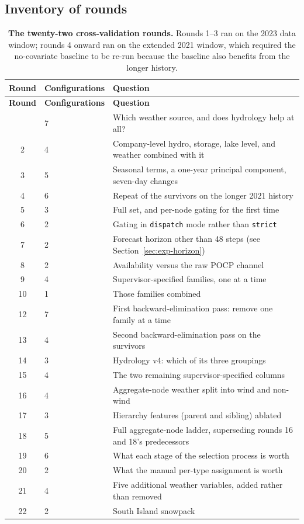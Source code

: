 \subsection{Inventory of rounds}

\begin{longtable}{clp{7.0cm}}
\caption[Cross-validation rounds]{\textbf{The twenty-two cross-validation rounds.}
Rounds 1--3 ran on the 2023 data window; rounds 4 onward ran on the extended 2021 window,
which required the no-covariate baseline to be re-run because the baseline also benefits
from the longer history.}
\label{tab:rounds} \\
\toprule
{\bf Round} & {\bf Configurations} & {\bf Question} \\
\midrule
\endfirsthead
\toprule
{\bf Round} & {\bf Configurations} & {\bf Question} \\
\midrule
\endhead
\bottomrule
\endfoot
1 & 7 & Which weather source, and does hydrology help at all? \\
2 & 4 & Company-level hydro, storage, lake level, and weather combined with it \\
3 & 5 & Seasonal terms, a one-year principal component, seven-day changes \\
4 & 6 & Repeat of the survivors on the longer 2021 history \\
5 & 3 & Full set, and per-node gating for the first time \\
6 & 2 & Gating in \verb+dispatch+ mode rather than \verb+strict+ \\
7 & 2 & Forecast horizon other than 48 steps (see Section~\ref{sec:exp-horizon}) \\
8 & 2 & Availability versus the raw POCP channel \\
9 & 4 & Supervisor-specified families, one at a time \\
10 & 1 & Those families combined \\
12 & 7 & First backward-elimination pass: remove one family at a time \\
13 & 4 & Second backward-elimination pass on the survivors \\
14 & 3 & Hydrology v4: which of its three groupings \\
15 & 4 & The two remaining supervisor-specified columns \\
16 & 4 & Aggregate-node weather split into wind and non-wind \\
17 & 3 & Hierarchy features (parent and sibling) ablated \\
18 & 5 & Full aggregate-node ladder, superseding rounds 16 and 18's predecessors \\
19 & 6 & What each stage of the selection process is worth \\
20 & 2 & What the manual per-type assignment is worth \\
21 & 4 & Five additional weather variables, added rather than removed \\
22 & 2 & South Island snowpack \\
\end{longtable}

